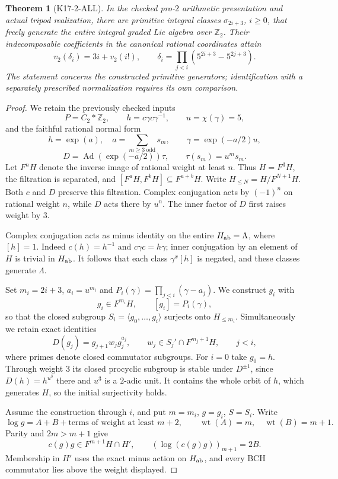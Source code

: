 \documentclass[11pt,a4paper]{article}
\newtheorem{theorem}{Theorem}[section]
\theoremstyle{definition}
\begin{document}
\begin{theorem}[K17-2-ALL]\label{thm:2-allweights}
In the checked pro-$2$ arithmetic presentation and actual
tripod realization, there are primitive integral classes
$\sigma_{2i+3}$, $i\geq0$, that freely generate the entire
integral graded Lie algebra over $\mathbb Z_2$.
Their indecomposable coefficients in the canonical rational
coordinates attain
\[
 v_2(\delta_i)=3i+v_2(i!),\qquad
 \delta_i=\prod_{j<i}(5^{2i+3}-5^{2j+3}).
\]
The statement concerns the constructed primitive generators;
identification with a separately prescribed normalization
requires its own comparison.
\end{theorem}

\begin{proof}
We retain the previously checked inputs
\[
 P=C_2*\mathbb Z_2,\qquad
 h=c\gamma c\gamma^{-1},\qquad u=\chi(\gamma)=5,
\]
and the faithful rational normal form
\[
 h=\exp(a),\quad a=\sum_{m\geq3\ {\mathrm{odd}}}s_m,
 \qquad\gamma=\exp(-a/2)u,
\]
\[
 D=\operatorname{Ad}(\exp(-a/2))\tau,
 \qquad\tau(s_m)=u^m s_m.
\]
Let $F^nH$ denote the inverse image of rational weight at
least $n$. Thus $H=F^3H$, the filtration is separated, and
$[F^aH,F^bH]\subseteq F^{a+b}H$. Write
$H_{\leq N}=H/F^{N+1}H$. Both $c$ and $D$ preserve this
filtration. Complex conjugation acts by $(-1)^n$ on rational
weight $n$, while $D$ acts there by $u^n$. The inner factor
of $D$ first raises weight by $3$.

Complex conjugation acts as minus identity on the entire
$H_{\rm ab}=\Lambda$, where $[h]=1$.
Indeed $c(h)=h^{-1}$ and $c\gamma c=h\gamma$; inner
conjugation by an element of $H$ is trivial in $H_{\rm ab}$.
It follows that each class $\gamma^x[h]$ is negated, and
these classes generate $\Lambda$.

Set $m_i=2i+3$, $a_i=u^{m_i}$ and
$P_i(\gamma)=\prod_{j<i}(\gamma-a_j)$.
We construct $g_i$ with
\[
 g_i\in F^{m_i}H,\qquad [g_i]=P_i(\gamma),            \tag{A3}
\]
so that the closed subgroup
$S_i=\langle g_0,\ldots,g_i\rangle$ surjects onto
$H_{\leq m_i}$. Simultaneously we retain exact identities
\[
 D(g_j)=g_{j+1}w_jg_j^{a_j},\qquad
 w_j\in S_j'\cap F^{m_j+1}H,\qquad j<i,             \tag{A4}
\]
where primes denote closed commutator subgroups.
For $i=0$ take $g_0=h$. Through weight $3$ its closed
procyclic subgroup is stable under $D^{\pm1}$, since
$D(h)=h^{u^3}$ there and $u^3$ is a $2$-adic unit.
It contains the whole orbit of $h$, which generates $H$,
so the initial surjectivity holds.

Assume the construction through $i$, and put $m=m_i$,
$g=g_i$, $S=S_i$. Write
\[
 \log g=A+B+\text{terms of weight at least }m+2,
       \qquad\operatorname{wt}(A)=m,\quad
              \operatorname{wt}(B)=m+1.
\]
Parity and $2m>m+1$ give
\[
 c(g)g\in F^{m+1}H\cap H',\qquad
          (\log(c(g)g))_{m+1}=2B.                   \tag{A5}
\]
Membership in $H'$ uses the exact minus action on
$H_{\rm ab}$, and every BCH commutator lies above the
weight displayed.


\end{proof}
\end{document}
